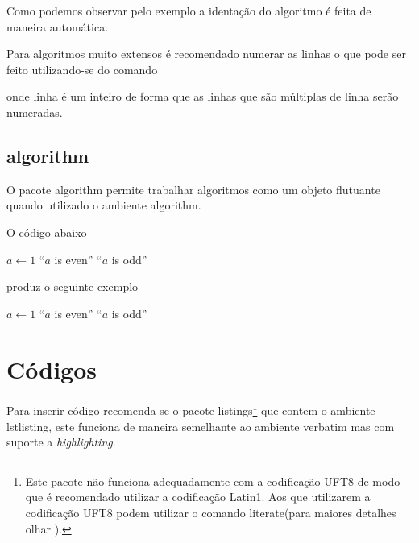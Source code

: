 Como podemos observar pelo exemplo a identação do algoritmo é feita de maneira automática.

Para algoritmos muito extensos é recomendado numerar as linhas o que pode ser feito utilizando-se do comando
\begin{latexcode}
    \end{algorithm}
\end{latexcode}
produz o seguinte exemplo
\begin{algorithm}
    \caption{Exemplo do ambiente \textsf{algorithm}.}
    \label{alg:exem}
    \begin{algorithmic}
        \STATE $a \leftarrow 1$
        \PRINT ``$a$ is even''
        \ELSE
        \PRINT ``$a$ is odd''
        \ENDIF
    \end{algorithmic}
\end{algorithm}

\section{Códigos}

Para inserir código recomenda-se o pacote \textsf{listings}\footnote{Este pacote não funciona adequadamente com a codificação UFT8 de modo que é recomendado utilizar a codificação Latin1. Aos que utilizarem a codificação UFT8 podem utilizar o comando \textsf{literate}(para maiores detalhes olhar \cite{Moses:2007:Listings}).} que contem o ambiente \textsf{lstlisting}, este funciona de maneira semelhante ao ambiente \textsf{verbatim} mas com suporte a \textit{highlighting}.

